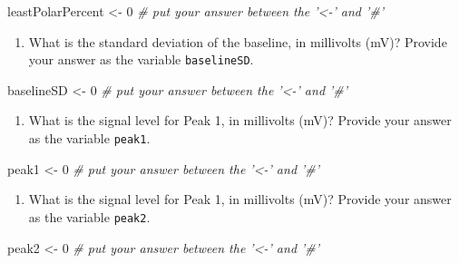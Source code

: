 \documentclass[]{tufte-book}
\newenvironment{Shaded}{}{}
\newcommand{\CommentTok}[1]{\textcolor[rgb]{0.38,0.63,0.69}{\textit{#1}}}
\newcommand{\DecValTok}[1]{\textcolor[rgb]{0.25,0.63,0.44}{#1}}
\newcommand{\NormalTok}[1]{#1}
\newcommand{\StringTok}[1]{\textcolor[rgb]{0.25,0.44,0.63}{#1}}
\providecommand{\tightlist}{%
  \setlength{\itemsep}{0pt}\setlength{\parskip}{0pt}}
\begin{document}
\begin{Shaded}
\begin{Highlighting}[]
\NormalTok{leastPolarPercent <-}\StringTok{ }\DecValTok{0}  \CommentTok{# put your answer between the '<-' and '#'}
\end{Highlighting}
\end{Shaded}

\begin{enumerate}
\def\labelenumi{\arabic{enumi}.}
\setcounter{enumi}{5}
\tightlist
\item
  What is the standard deviation of the baseline, in millivolts (mV)? Provide your answer as the variable \texttt{baselineSD}.
\end{enumerate}

\begin{Shaded}
\begin{Highlighting}[]
\NormalTok{baselineSD <-}\StringTok{ }\DecValTok{0}  \CommentTok{# put your answer between the '<-' and '#'}
\end{Highlighting}
\end{Shaded}

\begin{enumerate}
\def\labelenumi{\arabic{enumi}.}
\setcounter{enumi}{6}
\tightlist
\item
  What is the signal level for Peak 1, in millivolts (mV)? Provide your answer as the variable \texttt{peak1}.
\end{enumerate}

\begin{Shaded}
\begin{Highlighting}[]
\NormalTok{peak1 <-}\StringTok{ }\DecValTok{0}  \CommentTok{# put your answer between the '<-' and '#'}
\end{Highlighting}
\end{Shaded}

\begin{enumerate}
\def\labelenumi{\arabic{enumi}.}
\setcounter{enumi}{7}
\tightlist
\item
  What is the signal level for Peak 1, in millivolts (mV)? Provide your answer as the variable \texttt{peak2}.
\end{enumerate}

\begin{Shaded}
\begin{Highlighting}[]
\NormalTok{peak2 <-}\StringTok{ }\DecValTok{0}  \CommentTok{# put your answer between the '<-' and '#'}
\end{Highlighting}
\end{Shaded}
\end{document}
